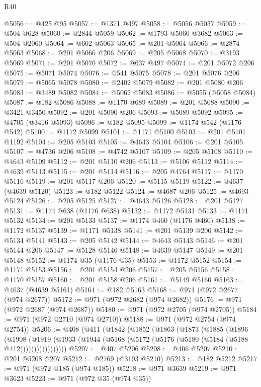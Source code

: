 \begin{lexlean}{R40}
\begin{coremodule}
@5056 := @425 @95
@5057 := @1371 @497
@5058 := @5056 @5057
@5059 := @504 @628
@5060 := @2844 @5059
@5062 := @1793 @5060 @3682
@5063 := @504 @2060
@5064 := @602 @5063
@5065 := @201 @5064
@5066 := @2874 @5063
@5068 := @201 @5066 @206
@5069 := @205 @5068
@5070 := @3193 @5069
@5071 := @201 @5070
@5072 := @637 @497
@5074 := @201 @5072 @206
@5075 := @5071 @5074
@5076 := @541 @5075
@5078 := @201 @5076 @206
@5079 := @5065 @5078
@5080 := @2402 @5079
@5082 := @201 @5080 @206
@5083 := @3489 @5082
@5084 := @5062 @5083
@5086 := @5055 (@5058 @5084)
@5087 := @182 @5086
@5088 := @1170 @689
@5089 := @201 @5088
@5090 := @3421 @3450
@5092 := @201 @5090 @206
@5093 := @5089 @5092
@5095 := @4705 (@3416 @5093)
@5096 := @182 @5095
@5099 := @1174 @542 (@1176 @542)
@5100 := @1172 @5099
@5101 := @1171 @5100
@5103 := @201 @5101 @1192
@5104 := @205 @5103
@5105 := @4643 @5104
@5106 := @201 @5105
@5107 := @4736 @206
@5108 := @4742 @5107
@5109 := @205 @5108
@5110 := @4643 @5109
@5112 := @201 @5110 @206
@5113 := @5106 @5112
@5114 := @4639 @5113
@5115 := @201 @5114
@5116 := @205 @4764
@5117 := @1170 @5116
@5119 := @201 @5117 @206
@5120 := @5115 @5119
@5122 := @4637 (@4639 @5120)
@5123 := @182 @5122
@5124 := @4687 @206
@5125 := @4693 @5124
@5126 := @205 @5125
@5127 := @4643 @5126
@5128 := @201 @5127
@5131 := @1174 @638 (@1176 @638)
@5132 := @1172 @5131
@5133 := @1171 @5132
@5134 := @201 @5133
@5137 := @1174 @460 (@1176 @460)
@5138 := @1172 @5137
@5139 := @1171 @5138
@5141 := @201 @5139 @206
@5142 := @5134 @5141
@5143 := @205 @5142
@5144 := @4643 @5143
@5146 := @201 @5144 @206
@5147 := @5128 @5146
@5148 := @4639 @5147
@5149 := @201 @5148
@5152 := @1174 @35 (@1176 @35)
@5153 := @1172 @5152
@5154 := @1171 @5153
@5156 := @201 @5154 @206
@5157 := @205 @5156
@5158 := @1170 @5157
@5160 := @201 @5158 @206
@5161 := @5149 @5160
@5163 := @4637 (@4639 @5161)
@5164 := @182 @5163
@5168 := @971 (@972 @2677 (@974 @2677))
@5172 := @971 (@972 @2682 (@974 @2682))
@5176 := @971 (@972 @2687 (@974 @2687))
@5180 := @971 (@972 @2705 (@974 @2705))
@5184 := @971 (@972 @2710 (@974 @2710))
@5188 := @971 (@972 @2754 (@974 @2754))
@5206 := @408
    (@411
      (@1842
        (@1852
          (@1863
            (@1873
              (@1885
                (@1896
                  (@1908
                    (@1919
                      (@1933 (@1944 (@5168 (@5172 (@5176 (@5180 (@5184 (@5188 @412)))))))))))))))))
@5207 := @407 @5206
@5208 := @406 @5207
@5210 := @201 @5208 @207
@5212 := @2769 (@3193 @5210)
@5213 := @182 @5212
@5217 := @971 (@972 @185 (@974 @185))
@5218 := @971 @3639
@5219 := @971 @3623
@5223 := @971 (@972 @35 (@974 @35))

\end{coremodule}
\end{lexlean}
